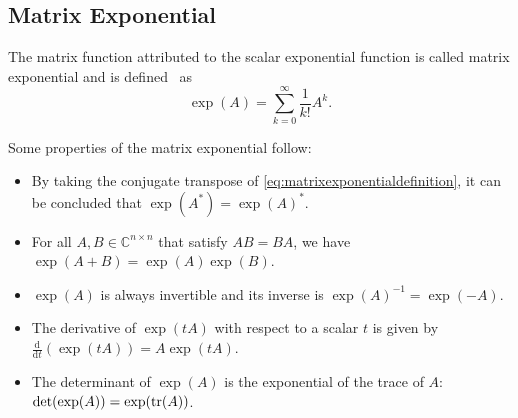 \subsection{Matrix Exponential}
The matrix function attributed to the scalar exponential function is called
matrix exponential and is defined~\cite{higham2008functions} as
\begin{equation}
    \label{eq:matrixexponentialdefinition}
    \exp(A) = \sum_{k=0}^{\infty}{\frac{1}{k!} A^k}.
\end{equation}

Some properties of the matrix exponential follow:
\begin{itemize}
    \item By taking the conjugate transpose of \eqref{eq:matrixexponentialdefinition},
        it can be concluded that $\exp(A^{*}) = \exp(A)^{*}$.
    \item For all $A, B \in \mathbb{C}^{n \times n}$ that satisfy $AB = BA$,
        we have $\exp(A + B) = \exp(A) \exp(B)$.
    \item $\exp(A)$ is always invertible and its inverse is $\exp(A)^{-1} = \exp(-A)$.
    \item The derivative of $\exp(tA)$ with respect to a scalar $t$ is given by
        $\frac{\mathrm{d}}{\mathrm{d} t} (\exp(tA)) = A \exp(tA)$.
    \item The determinant of $\exp(A)$ is the exponential of the trace of
        $A$: $\det(\exp(A)) = \exp(\trace(A))$.
\end{itemize}

